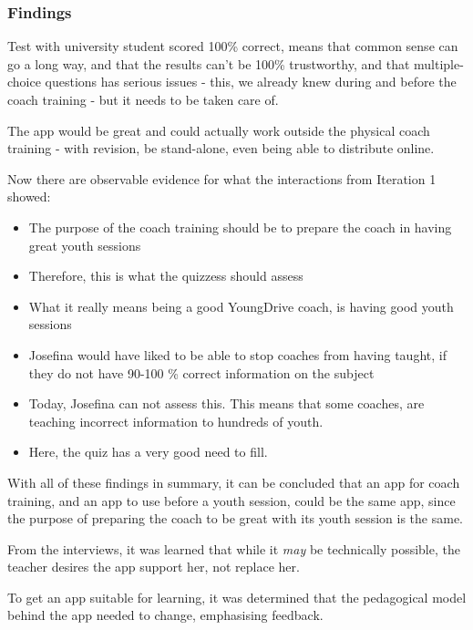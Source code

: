 \subsubsection{Findings}

Test with university student scored 100\% correct, means that common sense can go a long way, and that the results can't be 100\% trustworthy, and that multiple-choice questions has serious issues - this, we already knew during and before the coach training - but it needs to be taken care of.

The app would be great and could actually work outside the physical coach training - with revision, be stand-alone, even being able to distribute online.

Now there are observable evidence for what the interactions from Iteration 1 showed:

\begin{itemize}
\item The purpose of the coach training should be to prepare the coach in having great youth sessions
\item Therefore, this is what the quizzess should assess
\item What it really means being a good YoungDrive coach, is having good youth sessions
\item Josefina would have liked to be able to stop coaches from having taught, if they do not have 90-100 \% correct information on the subject
\item Today, Josefina can not assess this. This means that some coaches, are teaching incorrect information to hundreds of youth.
\item Here, the quiz has a very good need to fill.
\end{itemize}

With all of these findings in summary, it can be concluded that an app for coach training, and an app to use before a youth session, could be the same app, since the purpose of preparing the coach to be great with its youth session is the same.

From the interviews, it was learned that while it \textit{may} be technically possible, the teacher desires the app support her, not replace her.

To get an app suitable for learning, it was determined that the pedagogical model behind the app needed to change, emphasising feedback.
